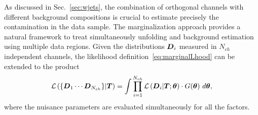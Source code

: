 As discussed in Sec.~\ref{sec:wjets}, the combination of
orthogonal channels with different background compositions is crucial
to estimate precisely the \wjets{} contamination in the \eighttev{}
data sample.
The marginalization approach provides a natural framework to treat
simultaneously unfolding and background estimation using
multiple data regions. Given the distributions $\boldsymbol{D}{}_i$ measured in $N_{ch}$
independent channels, the likelihood definition~\ref{eq:marginalLhood}
can be extended to the product  
\begin{equation}
  \mathcal{L}\left(\{\boldsymbol{D}{}_1\cdots{}\boldsymbol{D}{}_{N_{ch}}\}|\boldsymbol{T}{}\right)=
  \int
  \prod_{i=1}^{N_{ch}}\mathcal{L}\left(\boldsymbol{D}{}_i|\boldsymbol{T}{};\boldsymbol{\theta}{}\right) 
  \cdot{} G(\boldsymbol{\theta}{})
  ~d\boldsymbol{\theta}{},
\end{equation}
where the nuisance parameters are evaluated simultaneously for all the
factors.